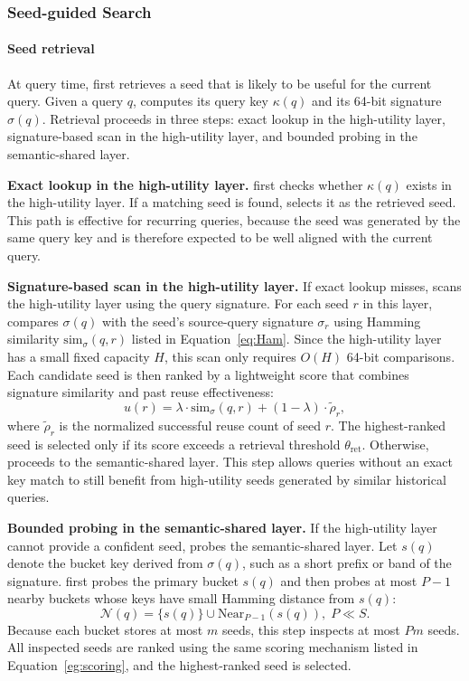 \subsubsection{Seed-guided Search}
\paragraph{Seed retrieval}
At query time, \system first retrieves a seed that is likely to be useful for the current query.
Given a query $q$, \system computes its query key $\kappa(q)$ and its 64-bit signature $\sigma(q)$.
Retrieval proceeds in three steps: exact lookup in the high-utility layer, signature-based scan in the high-utility layer, and bounded probing in the semantic-shared layer.

\textbf{Exact lookup in the high-utility layer.}
\system first checks whether $\kappa(q)$ exists in the high-utility layer.
If a matching seed is found, \system selects it as the retrieved seed.
This path is effective for recurring queries, because the seed was generated by the same query key and is therefore expected to be well aligned with the current query.

\textbf{Signature-based scan in the high-utility layer.}
If exact lookup misses, \system scans the high-utility layer using the query signature.
For each seed $r$ in this layer, \system compares $\sigma(q)$ with the seed's source-query signature $\sigma_r$ using Hamming similarity $\mathrm{sim}_{\sigma}(q,r)$ listed in Equation~\ref{eq:Ham}.
Since the high-utility layer has a small fixed capacity $H$, this scan only requires $O(H)$ 64-bit comparisons.
Each candidate seed is then ranked by a lightweight score that combines signature similarity and past reuse effectiveness:
\begin{equation}
u(r)
=
\lambda \cdot \mathrm{sim}_{\sigma}(q,r)
+
(1-\lambda)\cdot \widetilde{\rho}_r ,
\label{eg:scoring}
\end{equation}
where $\widetilde{\rho}_r$ is the normalized successful reuse count of seed $r$.
The highest-ranked seed is selected only if its score exceeds a retrieval threshold $\theta_{\mathrm{ret}}$.
Otherwise, \system proceeds to the semantic-shared layer.
This step allows queries without an exact key match to still benefit from high-utility seeds generated by similar historical queries.

\textbf{Bounded probing in the semantic-shared layer.}
If the high-utility layer cannot provide a confident seed, \system probes the semantic-shared layer.
Let $s(q)$ denote the bucket key derived from $\sigma(q)$, such as a short prefix or band of the signature.
\system first probes the primary bucket $s(q)$ and then probes at most $P-1$ nearby buckets whose keys have small Hamming distance from $s(q)$:
\begin{equation}
\mathcal{N}(q)=\{s(q)\}\cup \mathrm{Near}_{P-1}(s(q)), \; P\ll S.
\end{equation}
Because each bucket stores at most $m$ seeds, this step inspects at most $Pm$ seeds.
All inspected seeds are ranked using the same scoring mechanism listed in Equation~\ref{eg:scoring}, and the highest-ranked seed is selected.

